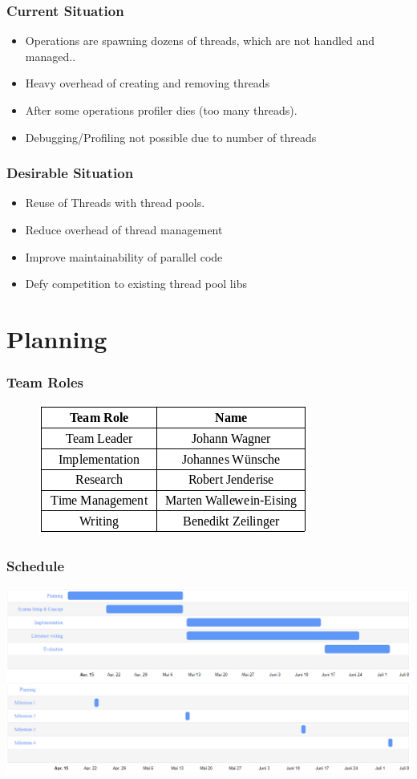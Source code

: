 \documentclass{beamer}
\begin{document}
	\begin{frame}
		\frametitle{Current Situation}
		\begin{itemize}
			\item Operations are spawning dozens of threads, which are not handled and managed..
			\item Heavy overhead of creating and removing threads
			\item After some operations profiler dies (too many threads).
			\item Debugging/Profiling not possible due to number of threads 
		\end{itemize}
	\end{frame}

	\begin{frame}
		\frametitle{Desirable Situation}
		\begin{itemize}
			\item Reuse of Threads with thread pools.
			\item Reduce overhead of thread management
			\item Improve maintainability of parallel code
			\item Defy competition to existing thread pool libs
		\end{itemize}
	\end{frame}

\section{Planning}

\begin{frame}
	\frametitle{Team Roles}
	\begin{figure}
		\includegraphics[width=0.7\linewidth]{img/TeamRoles}
	\end{figure}
\end{frame}

\begin{frame}
	\frametitle{Schedule}
	\includegraphics[width=1.0\textwidth]{img/schedule.png}
\end{frame}
\end{document}
